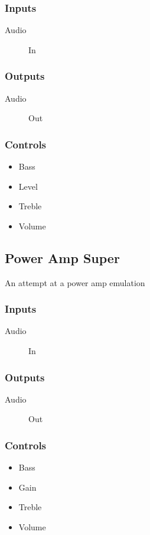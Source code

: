 \subsubsection{Inputs}
\begin{description}
\item [Audio] In
\end{description}

\subsubsection{Outputs}
\begin{description}
\item [Audio] Out
\end{description}

\subsubsection{Controls}
\begin{itemize}
\item Bass
\item Level
\item Treble
\item Volume
\end{itemize}

\subsection{Power Amp Super}

An attempt at a power amp emulation



\subsubsection{Inputs}
\begin{description}
\item [Audio] In
\end{description}

\subsubsection{Outputs}
\begin{description}
\item [Audio] Out
\end{description}

\subsubsection{Controls}
\begin{itemize}
\item Bass
\item Gain
\item Treble
\item Volume
\end{itemize}

